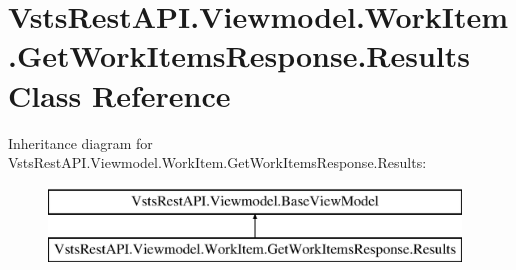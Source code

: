 \hypertarget{class_vsts_rest_a_p_i_1_1_viewmodel_1_1_work_item_1_1_get_work_items_response_1_1_results}{}\section{Vsts\+Rest\+A\+P\+I.\+Viewmodel.\+Work\+Item.\+Get\+Work\+Items\+Response.\+Results Class Reference}
\label{class_vsts_rest_a_p_i_1_1_viewmodel_1_1_work_item_1_1_get_work_items_response_1_1_results}
Inheritance diagram for Vsts\+Rest\+A\+P\+I.\+Viewmodel.\+Work\+Item.\+Get\+Work\+Items\+Response.\+Results\+:\begin{figure}[H]
\begin{center}
\leavevmode
\includegraphics[height=2.000000cm]{class_vsts_rest_a_p_i_1_1_viewmodel_1_1_work_item_1_1_get_work_items_response_1_1_results}
\end{center}
\end{figure}
